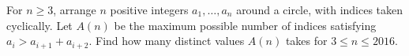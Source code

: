 For $n\ge3$, arrange $n$ positive integers $a_1,\ldots,a_n$ around a circle, with indices taken cyclically. Let $A(n)$ be the maximum possible number of indices satisfying $a_i>a_{i+1}+a_{i+2}$. Find how many distinct values $A(n)$ takes for $3\le n\le2016$.
